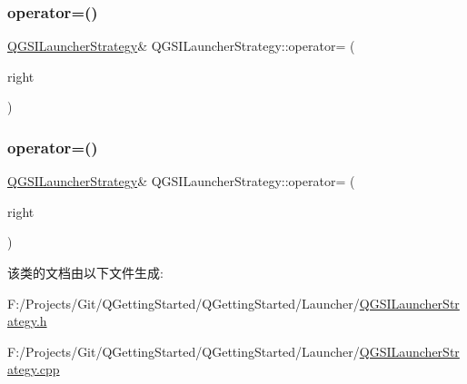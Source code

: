 \subsubsection{\texorpdfstring{operator=()}{operator=()}\hspace{0.1cm}{\footnotesize\ttfamily [1/2]}}
{\footnotesize\ttfamily \mbox{\hyperlink{class_q_g_s_i_launcher_strategy}{Q\+G\+S\+I\+Launcher\+Strategy}}\& Q\+G\+S\+I\+Launcher\+Strategy\+::operator= (\begin{DoxyParamCaption}\item[{const \mbox{\hyperlink{class_q_g_s_i_launcher_strategy}{Q\+G\+S\+I\+Launcher\+Strategy}} \&}]{right }\end{DoxyParamCaption})\hspace{0.3cm}{\ttfamily [delete]}}

\mbox{\label{class_q_g_s_i_launcher_strategy_a200e750013974d9abfc34c6910f6a35f}} 
\subsubsection{\texorpdfstring{operator=()}{operator=()}\hspace{0.1cm}{\footnotesize\ttfamily [2/2]}}
{\footnotesize\ttfamily \mbox{\hyperlink{class_q_g_s_i_launcher_strategy}{Q\+G\+S\+I\+Launcher\+Strategy}}\& Q\+G\+S\+I\+Launcher\+Strategy\+::operator= (\begin{DoxyParamCaption}\item[{\mbox{\hyperlink{class_q_g_s_i_launcher_strategy}{Q\+G\+S\+I\+Launcher\+Strategy}} \&\&}]{right }\end{DoxyParamCaption})\hspace{0.3cm}{\ttfamily [delete]}}



该类的文档由以下文件生成\+:\begin{DoxyCompactItemize}
\item 
F\+:/\+Projects/\+Git/\+Q\+Getting\+Started/\+Q\+Getting\+Started/\+Launcher/\mbox{\hyperlink{_q_g_s_i_launcher_strategy_8h}{Q\+G\+S\+I\+Launcher\+Strategy.\+h}}\item 
F\+:/\+Projects/\+Git/\+Q\+Getting\+Started/\+Q\+Getting\+Started/\+Launcher/\mbox{\hyperlink{_q_g_s_i_launcher_strategy_8cpp}{Q\+G\+S\+I\+Launcher\+Strategy.\+cpp}}\end{DoxyCompactItemize}
